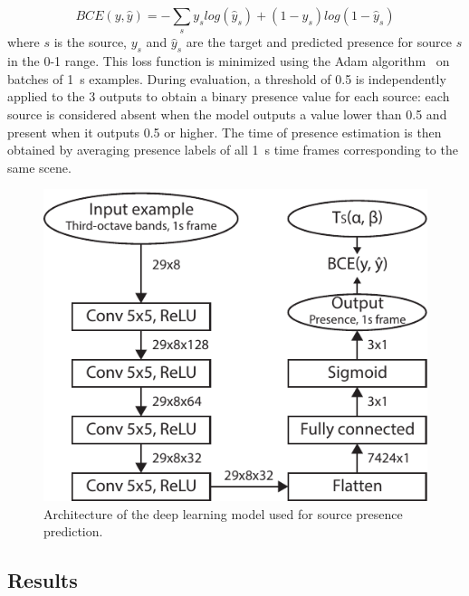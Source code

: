 \documentclass[twocolumn]{article}
\begin{document}
\begin{equation}
BCE(y, \hat y) = -\sum_s y_s log\left(\hat y_s\right) + (1-y_s) log\left(1-\hat y_s\right)
\end{equation}
where $s$ is the source, $y_s$ and $\hat y_s$ are the target and predicted presence for source $s$ in the 0-1 range. This loss function is minimized using the Adam algorithm~\cite{kingma2015} on batches of 1~s examples. During evaluation, a threshold of 0.5 is independently applied to the 3 outputs to obtain a binary presence value for each source: each source is considered absent when the model outputs a value lower than 0.5 and present when it outputs 0.5 or higher. The time of presence estimation is then obtained by averaging presence labels of all 1~s time frames corresponding to the same scene.

\begin{figure}[h!]
    \centering
    \includegraphics[width=\columnwidth]{figures/deep_arch.pdf}
    \caption{Architecture of the deep learning model used for source presence prediction.}\label{fig:deep_arch}
\end{figure}

\subsection{Results}
\label{sec:pred_res}
\end{document}
